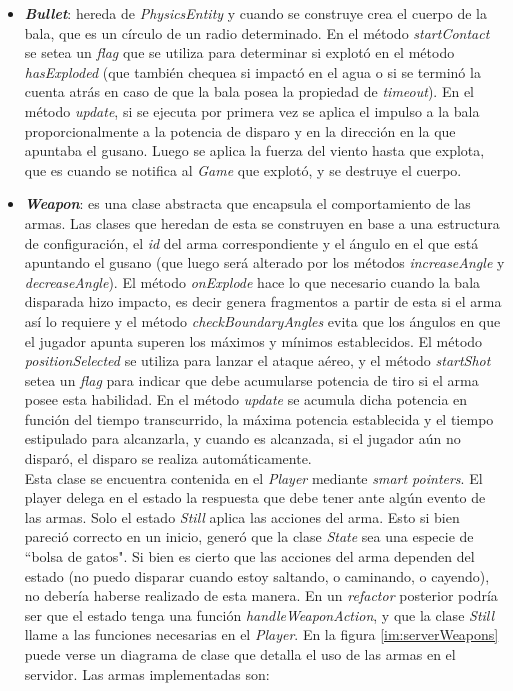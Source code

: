 \begin{itemize}
	\item \textbf{\textit{Bullet}}: hereda de \textit{PhysicsEntity} y cuando se construye crea el cuerpo de la bala, que es un círculo de un radio determinado. En el método \textit{startContact} se setea un \textit{flag} que se utiliza para determinar si explotó en el método \textit{hasExploded} (que también chequea si impactó en el agua o si se terminó la cuenta atrás en caso de que la bala posea la propiedad de \textit{timeout}). En el método \textit{update}, si se ejecuta por primera vez se aplica el impulso a la bala proporcionalmente a la potencia de disparo y en la dirección en la que apuntaba el gusano. Luego se aplica la fuerza del viento hasta que explota, que es cuando se notifica al \textit{Game} que explotó, y se destruye el cuerpo.

	\item \textbf{\textit{Weapon}}: es una clase abstracta que encapsula el comportamiento de las armas. Las clases que heredan de esta se construyen en base a una estructura de configuración, el \textit{id} del arma correspondiente y el ángulo en el que está apuntando el gusano (que luego será alterado por los métodos \textit{increaseAngle} y \textit{decreaseAngle}). El método \textit{onExplode} hace lo que necesario cuando la bala disparada hizo impacto, es decir genera fragmentos a partir de esta si el arma así lo requiere y el método \textit{checkBoundaryAngles} evita que los ángulos en que el jugador apunta superen los máximos y mínimos establecidos. El método \textit{positionSelected} se utiliza para lanzar el ataque aéreo, y el método \textit{startShot} setea un \textit{flag} para indicar que debe acumularse potencia de tiro si el arma posee esta habilidad. En el método \textit{update} se acumula dicha potencia en función del tiempo transcurrido, la máxima potencia establecida y el tiempo estipulado para alcanzarla, y cuando es alcanzada, si el jugador aún no disparó, el disparo se realiza automáticamente.\\
	Esta clase se encuentra contenida en el \textit{Player} mediante \textit{\emph{smart pointers}}. El player delega en el estado la respuesta que debe tener ante algún evento de las armas. Solo el estado \textit{\emph{Still}} aplica las acciones del arma. Esto si bien pareció correcto en un inicio, generó que la clase \textit{State} sea una especie de ``bolsa de gatos". Si bien es cierto que las acciones del arma dependen del estado (no puedo disparar cuando estoy saltando, o caminando, o cayendo), no debería haberse realizado de esta manera. En un \textit{refactor} posterior podría ser que el estado tenga una función \textit{\emph{handleWeaponAction}}, y que la clase \textit{Still} llame a las funciones necesarias en el \textit{Player}. En la figura \ref{im:serverWeapons} puede verse un diagrama de clase que detalla el uso de las armas en el servidor. Las armas implementadas son:


\end{itemize}
